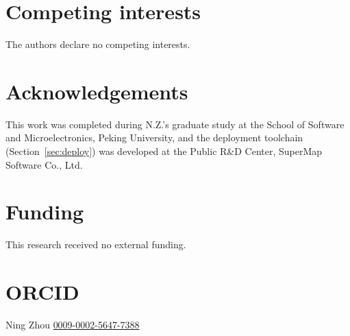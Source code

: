 \documentclass[11pt]{article}
\begin{document}
\section*{Competing interests}
The authors declare no competing interests.

\section*{Acknowledgements}
This work was completed during N.Z.'s graduate study at the School of Software and Microelectronics, Peking University, and the deployment toolchain (Section~\ref{sec:deploy}) was developed at the Public R\&D Center, SuperMap Software Co., Ltd.

\section*{Funding}
This research received no external funding.

\section*{ORCID}
Ning Zhou \href{https://orcid.org/0009-0002-5647-7388}{0009-0002-5647-7388}


\end{document}
